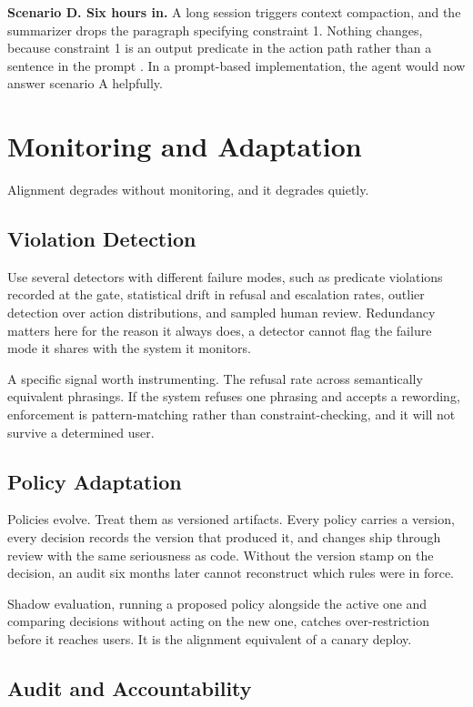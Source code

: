 \textbf{Scenario D. Six hours in.} A long session triggers context compaction, and
the summarizer drops the paragraph specifying constraint 1. Nothing changes,
because constraint 1 is an output predicate in the action path rather than a
sentence in the prompt \cite{govdecay2026}. In a prompt-based implementation, the
agent would now answer scenario A helpfully.

\section{Monitoring and Adaptation}

Alignment degrades without monitoring, and it degrades quietly.

\subsection{Violation Detection}

Use several detectors with different failure modes, such as predicate violations recorded
at the gate, statistical drift in refusal and escalation rates, outlier detection
over action distributions, and sampled human review. Redundancy matters here for
the reason it always does, a detector cannot flag the failure mode it shares
with the system it monitors.

A specific signal worth instrumenting. The refusal rate across semantically
equivalent phrasings. If the system refuses one phrasing and accepts a rewording,
enforcement is pattern-matching rather than constraint-checking, and it will not
survive a determined user.

\subsection{Policy Adaptation}

Policies evolve. Treat them as versioned artifacts. Every policy carries a version,
every decision records the version that produced it, and changes ship through
review with the same seriousness as code. Without the version stamp on the
decision, an audit six months later cannot reconstruct which rules were in force.

Shadow evaluation, running a proposed policy alongside the active one and
comparing decisions without acting on the new one, catches over-restriction
before it reaches users. It is the alignment equivalent of a canary deploy.

\subsection{Audit and Accountability}

